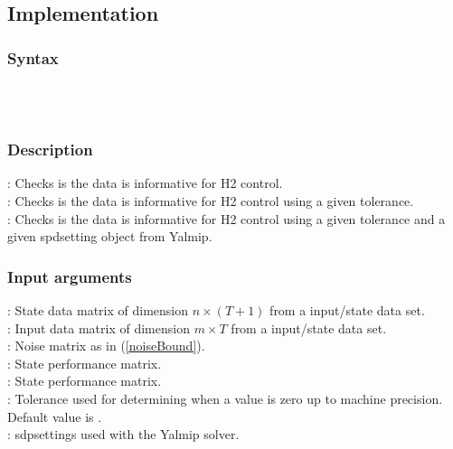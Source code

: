 \subsection{Implementation}
\subsubsection*{Syntax} 
 \\
 \\

\subsubsection*{Description}
: Checks is the data is informative for \mbox{H2} control. \\
: Checks is the data is informative for \mbox{H2} control using a given tolerance. \\
: Checks is the data is informative for \mbox{H2} control using a given tolerance and a given spdsetting object from Yalmip.

\subsubsection*{Input arguments}
\textbf{}: State data matrix of dimension $n \times (T+1)$ from a input/state data set.\\
\textbf{}: Input data matrix of dimension $m \times T$ from a input/state data set.\\
\textbf{}: Noise matrix as in (\ref{noiseBound}). \\ 
\textbf{}: State performance matrix. \\ 
\textbf{}: State performance matrix. \\ 
\textbf{}: Tolerance used for determining when a value is zero up to machine precision. Default value is .\\
\textbf{}: sdpsettings used with the Yalmip solver.

